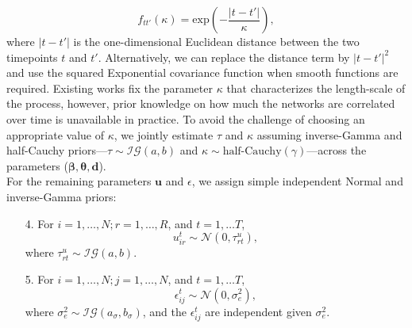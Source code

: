 \documentclass[a4paper]{article}
\begin{document}
\begin{equation*}
f_{tt'}(\kappa) = \mbox{exp}\left(-\frac{|t-t'|}{\kappa}\right),
\end{equation*}
where $|t-t'|$ is the one-dimensional Euclidean distance between the two timepoints $t$ and $t'$. Alternatively, we can replace the distance term by $|t-t'|^2$ and use the squared Exponential covariance function when smooth functions are required. Existing works \citep{bhattacharya2011sparse,durante2013nonparametric} fix the parameter $\kappa$ that characterizes the length-scale of the process, however, prior knowledge on how much the networks are correlated over time is unavailable in practice. To avoid the challenge of choosing an appropriate value of $\kappa$, we jointly estimate $\tau$ and $\kappa$ assuming inverse-Gamma and half-Cauchy priors---$\tau\sim \mathcal{IG}(a, b)$ and $\kappa \sim \mbox{half-Cauchy}(\gamma)$---across the parameters ($\boldsymbol{\beta}, \boldsymbol{\theta}, \boldsymbol{d}$). \\\newline
For the remaining parameters $\boldsymbol{u}$ and $\epsilon$, we assign simple independent Normal and inverse-Gamma priors:
\begin{itemize}
	\item[4.] For $i = 1,\ldots,N; r=1,\ldots,R$, and $t=1,\ldots T$, 
	\begin{equation*}
u^t_{ir}\sim\mathcal{N}(0, {\tau}^u_{rt}),
	\end{equation*}
	where ${\tau}^u_{rt}\sim \mathcal{IG}(a, b)$.
	\item[5.] For $i = 1,\ldots,N; j=1,\ldots,N$, and $t=1,\ldots T$, 
	\begin{equation*}	
	\epsilon^t_{ij} \sim \mathcal{N}(0, \sigma_e^2),
		\end{equation*}
		 where $\sigma_e^2 \sim \mathcal{IG}(a_\sigma, b_\sigma)$, and the $\epsilon^t_{ij}$ are independent given $\sigma_e^2$. 
\end{itemize}
\end{document}
